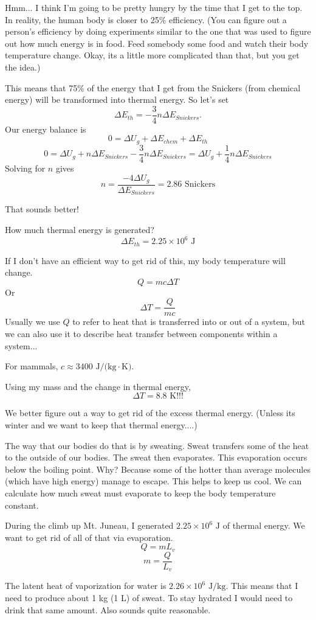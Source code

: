 Hmm... I think I'm going to be pretty hungry by the time that I get to the top. In reality, the human body is closer to 25\% efficiency. (You can figure out a person's efficiency by doing experiments similar to the one that was used to figure out how much energy is in food. Feed somebody some food and watch their body temperature change. Okay, its a little more complicated than that, but you get the idea.)

This means that 75\% of the energy that I get from the Snickers (from chemical energy) will be transformed into thermal energy. So let's set
$$\Delta{E_{th}}=-\frac{3}{4}n\Delta{E_{Snickers}}.$$
Our energy balance is
$$0=\Delta{U_g}+\Delta{E_{chem}}+\Delta{E_{th}}$$
$$0=\Delta{U_g}+n\Delta{E_{Snickers}}-\frac{3}{4}n\Delta{E_{Snickers}}=\Delta{U_g}+\frac{1}{4}n\Delta{E_{Snickers}}$$
Solving for $n$ gives
$$n=\frac{-4\Delta{U_g}}{\Delta{E_{Snickers}}}=\boxed{2.86\mbox{ Snickers}}$$

That sounds better!

How much thermal energy is generated?
$$\Delta{E_{th}}=\boxed{2.25\times 10^6\mbox{ J}}$$

If I don't have an efficient way to get rid of this, my body temperature will change.
$$Q=mc\Delta{T}$$
Or
$$\Delta{T}=\frac{Q}{mc}$$
Usually we use $Q$ to refer to heat that is transferred into or out of a system, but we can also use it to describe heat transfer between components within a system...

For mammals, $c\approx 3400\mbox{ J/(kg}\cdot\mbox{K)}$.

Using my mass and the change in thermal energy,
$$\boxed{\Delta{T}=8.8\mbox{ K!!!}}$$

We better figure out a way to get rid of the excess thermal energy. (Unless its winter and we want to keep that thermal energy....)

The way that our bodies do that is by sweating. Sweat transfers some of the heat to the outside of our bodies. The sweat then evaporates. This evaporation occurs below the boiling point. Why? Because some of the hotter than average molecules (which have high energy) manage to escape. This helps to keep us cool. We can calculate how much sweat must evaporate to keep the body temperature constant.

During the climb up Mt. Juneau, I generated $2.25\times 10^6\mbox{ J}$ of thermal energy. We want to get rid of all of that via evaporation.
$$Q=mL_v$$
$$m=\frac{Q}{L_v}$$

The latent heat of vaporization for water is $2.26\times 10^6\mbox{ J/kg}$. This means that I need to produce about 1 kg (1 L) of sweat. To stay hydrated I would need to drink that same amount. Also sounds quite reasonable.

\clearpage
